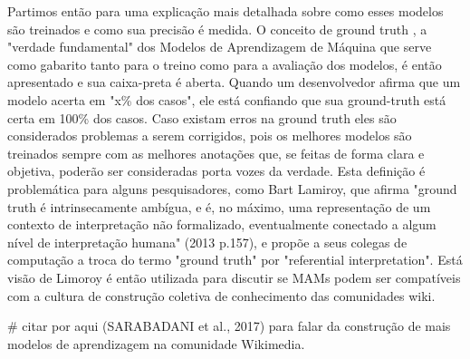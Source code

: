 Partimos então para uma explicação mais detalhada sobre como esses modelos são treinados e como sua precisão é medida. O conceito de ground truth , a "verdade fundamental" dos Modelos de Aprendizagem de Máquina que serve como gabarito tanto para o treino como para a avaliação dos modelos, é então apresentado e sua caixa-preta é aberta. Quando um desenvolvedor afirma que um modelo acerta em "x\% dos casos", ele está confiando que sua ground-truth está certa em 100\% dos casos. Caso existam erros na ground truth eles são considerados problemas a serem corrigidos, pois os melhores modelos são treinados sempre com as melhores anotações que, se feitas de forma clara e objetiva, poderão ser consideradas porta vozes da verdade. Esta definição é problemática para alguns pesquisadores, como Bart Lamiroy, que afirma "ground truth é intrinsecamente ambígua, e é, no máximo, uma representação de um contexto de interpretação não formalizado, eventualmente conectado a algum nível de interpretação humana" (2013 p.157), e propõe a seus colegas de computação a troca do termo "ground truth" por "referential interpretation". Está visão de Limoroy é então utilizada para discutir se MAMs podem ser compatíveis com a cultura de construção coletiva de conhecimento das comunidades wiki.

# citar por aqui (SARABADANI et al., 2017) para falar da construção de mais modelos de aprendizagem na comunidade Wikimedia.
